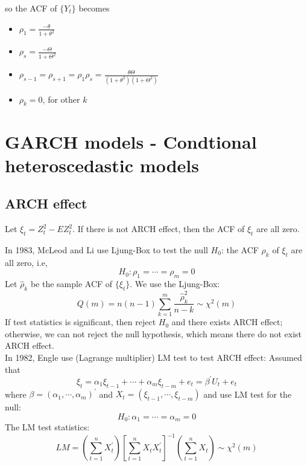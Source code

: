 \documentclass{article}
\begin{document}
\noindent so the ACF of $\{Y_t\}$ becomes
\begin{itemize}
	\item $\rho_{1}=\frac{-\theta}{1+\theta^{2}}$
	\item $\rho_{s}=\frac{-\Theta}{1+\Theta^{2}}$
	\item $\rho_{s-1}=\rho_{s+1}=\rho_{1} \rho_{s}=\frac{\theta \Theta}{\left(1+\theta^{2}\right)\left(1+\Theta^{2}\right)}$
	\item $\rho_k = 0$, for other $k$
\end{itemize}

\section{GARCH models - Condtional heteroscedastic models}
\subsection{ARCH effect}
Let $\xi_{t}=Z_{t}^{2}-E Z_{t}^{2}$. If there is not ARCH effect, then the ACF of $\xi_t$ are
all zero.

\noindent In 1983, McLeod and Li use Ljung-Box to test the null $H_0$: the ACF $\rho_k$ of $\xi_t$ are all zero, i.e,
\begin{equation*}
H_0: \rho_{1}=\cdots=\rho_{m}=0
\end{equation*}
Let $\hat{\rho}_{k}$ be the sample ACF of $\{\xi_t\}$. We use the Ljung-Box:
\begin{equation*}
Q(m)=n(n-1) \sum_{k=1}^{m} \frac{\hat{\rho}_{k}^{2}}{n-k} \sim \chi^{2}(m)
\end{equation*}
If test statistics is significant, then reject $H_0$ and there exists ARCH effect; otherwise, we can not reject the null hypothesis, which means there do not exist ARCH effect.\\

\noindent In 1982, Engle use (Lagrange multiplier) LM test to test ARCH effect:
Assumed that
\begin{equation*}
\xi_{t}=\alpha_{1} \xi_{t-1}+\cdots+\alpha_{m} \xi_{t-m}+e_{t}=\beta^{\prime} U_{t}+e_{t}
\end{equation*}
where $\beta=\left(\alpha_{1}, \cdots, \alpha_{m}\right)^{\prime}$ and $X_{t}=\left(\xi_{t-1}, \cdots, \xi_{t-m}\right)$ and use LM test for the null:
\begin{equation*}
H_{0} : \alpha_{1}=\cdots=\alpha_{m}=0
\end{equation*}
The LM test statistics:
\begin{equation*}
L M=\left(\sum_{t=1}^{n} X_{t}^{\prime}\right)\left[\sum_{t=1}^{n} X_{t} X_{t}^{\prime}\right]^{-1}\left(\sum_{t=1}^{n} X_{t}\right) \sim \chi^{2}(m)
\end{equation*}
\end{document}
